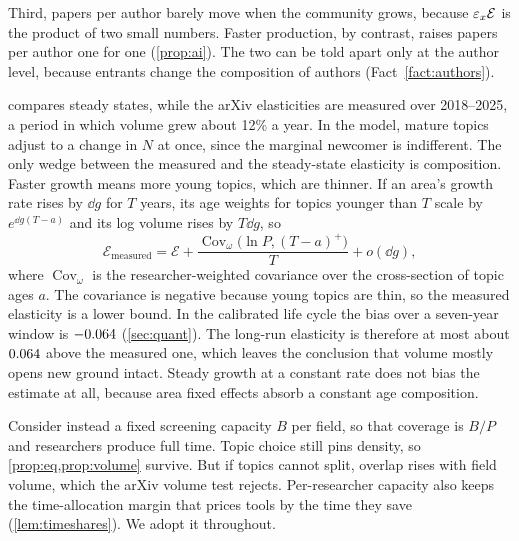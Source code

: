 Third, papers per author barely move when the community grows, because
$\varepsilon_x\mathcal E$ is the product of two small numbers. Faster production, by
contrast, raises papers per author one for one (\cref{prop:ai}). The two can
be told apart only at the author level, because entrants change the
composition of authors (Fact~\ref{fact:authors}).

\begin{remark}\label{rem:shortrun}
 compares steady states, while the arXiv elasticities are
measured over 2018--2025, a period in which volume grew about 12\% a year. In
the model, mature topics adjust to a change in $N$ at once, since the marginal
newcomer is indifferent. The only wedge between the measured and the
steady-state elasticity is composition. Faster growth means more young topics,
which are thinner. If an area's growth rate rises by $\dd g$ for $T$ years,
its age weights for topics younger than $T$ scale by $e^{\dd g(T-a)}$ and its
log volume rises by $T\dd g$, so
\begin{equation}\label{eq:shortrun}
\mathcal E_{\text{measured}}=\mathcal E+\frac{\operatorname{Cov}_\omega\big(\ln P,(T-a)^+\big)}{T}+o(\dd g),
\end{equation}
where $\operatorname{Cov}_\omega$ is the researcher-weighted covariance over the
cross-section of topic ages $a$. The covariance is negative because young topics
are thin, so the measured elasticity is a lower bound. In the calibrated
life cycle the bias over a seven-year window is $-0.064$
(\cref{sec:quant}). The long-run elasticity is therefore at most about
$0.064$ above the measured one, which leaves the conclusion that
volume mostly opens new ground intact. Steady growth at a constant rate does
not bias the estimate at all, because area fixed effects absorb a constant age
composition.
\end{remark}

\begin{remark}
Consider instead a fixed screening capacity $B$ per field, so that coverage is
$B/P$ and researchers produce full time. Topic choice still pins density, so
\cref{prop:eq,prop:volume} survive. But if topics cannot split, overlap rises
with field volume, which the arXiv volume test rejects. Per-researcher
capacity also keeps the time-allocation margin that prices tools by the time
they save (\cref{lem:timeshares}). We adopt it throughout.
\end{remark}

